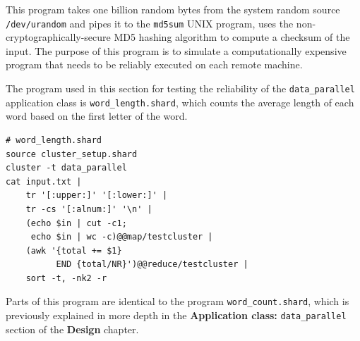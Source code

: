 \documentclass[twoside]{report}
\begin{document}
This program takes one billion random bytes from the system random source \texttt{/dev/urandom} and pipes it to the \texttt{md5sum} UNIX program, uses the non-cryptographically-secure MD5 hashing algorithm to compute a checksum of the input.
The purpose of this program is to simulate a computationally expensive program that needs to be reliably executed on each remote machine.

\begin{sloppypar}
  The program used in this section for testing the reliability of the \texttt{data\_parallel} application class is \texttt{word\_length.shard}, which counts the average length of each word based on the first letter of the word.
\end{sloppypar}
\begin{lstlisting}[language=Shard]
# word_length.shard
source cluster_setup.shard
cluster -t data_parallel
cat input.txt |
    tr '[:upper:]' '[:lower:]' |
    tr -cs '[:alnum:]' '\n' |
    (echo $in | cut -c1;
     echo $in | wc -c)@@map/testcluster |
    (awk '{total += $1}
          END {total/NR}')@@reduce/testcluster |
    sort -t, -nk2 -r
\end{lstlisting}

Parts of this program are identical to the program \texttt{word\_count.shard}, which is previously explained in more depth in the \textbf{Application class: }\texttt{data\_parallel} section of the \textbf{Design} chapter.
\end{document}
